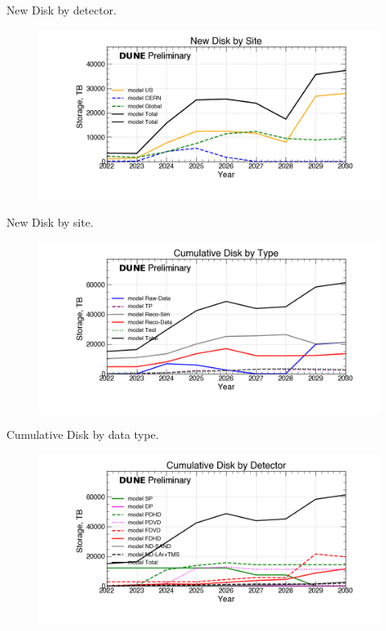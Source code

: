 \begin{table}[h]
\label{tab:DiskByYearByDetector}
\caption{New Disk by detector.}
\end{table}
\pagebreak
\begin{figure}[ht]
\centering\includegraphics[height=0.4\textwidth]{NearTerm_2024-08-14-2030_noMWC_New-Disk-by-Site-Storage.png}\end{figure}
\begin{table}[h]
\label{tab:DiskByYearBySite}
\caption{New Disk by site.}
\end{table}
\pagebreak
\begin{figure}[ht]
\centering\includegraphics[height=0.4\textwidth]{NearTerm_2024-08-14-2030_noMWC_Cumulative-Disk-by-Type-Storage.png}\end{figure}
\begin{table}[h]
\label{tab:DiskByYearByType}
\caption{Cumulative Disk by data type.}
\end{table}
\pagebreak
\begin{figure}[ht]
\centering\includegraphics[height=0.4\textwidth]{NearTerm_2024-08-14-2030_noMWC_Cumulative-Disk-by-Detector-Storage.png}\end{figure}
